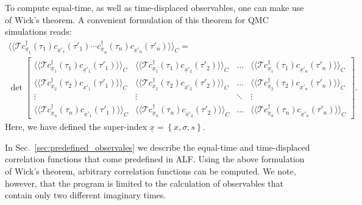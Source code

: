To compute equal-time, as well as time-displaced observables, one can make use of Wick's theorem. A convenient formulation of this theorem for QMC simulations reads: 
\begin{multline}
\langle \langle 	\mathcal{T}   c^{\dagger}_{\underline x_{1}}(\tau_{1}) c^{\phantom\dagger}_{{\underline x}'_{1}}(\tau'_{1})  
\cdots c^{\dagger}_{\underline x_{n}}(\tau_{n}) c^{\phantom\dagger}_{{\underline x}'_{n}}(\tau'_{n}) 
\rangle \rangle_{C} = \\
\det  
\begin{bmatrix}
   \langle \langle   \mathcal{T}   c^{\dagger}_{\underline x_{1}}(\tau_{1}) c^{\phantom\dagger}_{{\underline x}'_{1}}(\tau'_{1})  \rangle \rangle_{C} & 
    \langle \langle  \mathcal{T}   c^{\dagger}_{\underline x_{1}}(\tau_{1}) c^{\phantom\dagger}_{{\underline x}'_{2}}(\tau'_{2})  \rangle \rangle_{C}  & \dots   &   
    \langle \langle   \mathcal{T}   c^{\dagger}_{\underline x_{1}}(\tau_{1}) c^{\phantom\dagger}_{{\underline x}'_{n}}(\tau'_{n})  \rangle \rangle_{C}  \\
    \langle \langle   \mathcal{T}   c^{\dagger}_{\underline x_{2}}(\tau_{2}) c^{\phantom\dagger}_{{\underline x}'_{1}}(\tau'_{1})  \rangle \rangle_{C}  & 
      \langle \langle   \mathcal{T}   c^{\dagger}_{\underline x_{2}}(\tau_{2}) c^{\phantom\dagger}_{{\underline x}'_{2}}(\tau'_{2})  \rangle \rangle_{C}  & \dots  &
       \langle \langle   \mathcal{T}   c^{\dagger}_{\underline x_{2}}(\tau_{2}) c^{\phantom\dagger}_{{\underline x}'_{n}}(\tau'_{n})  \rangle \rangle_{C}   \\
    \vdots & \vdots &  \ddots & \vdots \\
    \langle \langle   \mathcal{T}   c^{\dagger}_{\underline x_{n}}(\tau_{n}) c^{\phantom\dagger}_{{\underline x}'_{1}}(\tau'_{1})  \rangle \rangle_{C}   & 
     \langle \langle   \mathcal{T}   c^{\dagger}_{\underline x_{n}}(\tau_{n}) c^{\phantom\dagger}_{{\underline x}'_{2}}(\tau'_{2})  \rangle \rangle_{C}   & \dots  & 
     \langle \langle   \mathcal{T}   c^{\dagger}_{\underline x_{n}}(\tau_{n}) c^{\phantom\dagger}_{{\underline x}'_{n}}(\tau'_{n})  \rangle \rangle_{C}
 \end{bmatrix}.
\end{multline}
Here, we have defined the super-index $\underline{ x} = \left\{   x,\sigma,s \right\}$.

In Sec.~\ref{sec:predefined_observales} we describe the equal-time and time-displaced correlation functions that come predefined in ALF.
Using the  above  formulation  of  Wick's theorem, arbitrary  correlation functions can be computed. We note, however, that the program is limited to the calculation of observables that contain only two different imaginary times.  

